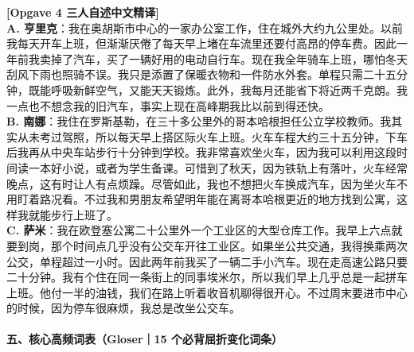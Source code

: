 \begin{transbox}
\small
\textbf{\color{NCDTeal}[Opgave 4 三人自述中文精译]}\\
\textbf{A. 亨里克}：我在奥胡斯市中心的一家办公室工作，住在城外大约九公里处。以前我每天开车上班，但渐渐厌倦了每天早上堵在车流里还要付高昂的停车费。因此一年前我卖掉了汽车，买了一辆好用的电动自行车。现在我全年骑车上班，哪怕冬天刮风下雨也照骑不误。我只是添置了保暖衣物和一件防水外套。单程只需二十五分钟，既能呼吸新鲜空气，又能天天锻炼。此外，我每月还能省下将近两千克朗。我一点也不想念我的旧汽车，事实上现在高峰期我比以前到得还快。\\
\textbf{B. 南娜}：我住在罗斯基勒，在三十多公里外的哥本哈根担任公立学校教师。我其实从未考过驾照，所以每天早上搭区际火车上班。火车车程大约三十五分钟，下车后我再从中央车站步行十分钟到学校。我非常喜欢坐火车，因为我可以利用这段时间读一本好小说，或者为学生备课。可惜到了秋天，因为铁轨上有落叶，火车经常晚点，这有时让人有点烦躁。尽管如此，我也不想把火车换成汽车，因为坐火车不用盯着路况看。不过我和男朋友希望明年能在离哥本哈根更近的地方找到公寓，这样我就能步行上班了。\\
\textbf{C. 萨米}：我在欧登塞公寓二十公里外一个工业区的大型仓库工作。我早上六点就要到岗，那个时间点几乎没有公交车开往工业区。如果坐公共交通，我得换乘两次公交，单程超过一小时。因此两年前我买了一辆二手小汽车。现在走高速公路只要二十分钟。我有个住在同一条街上的同事埃米尔，所以我们早上几乎总是一起拼车上班。他付一半的油钱，我们在路上听着收音机聊得很开心。不过周末要进市中心的时候，因为停车很麻烦，我总是改坐公交车。
\end{transbox}

\paragraph*{五、核心高频词表（Gloser｜15 个必背屈折变化词条）}

